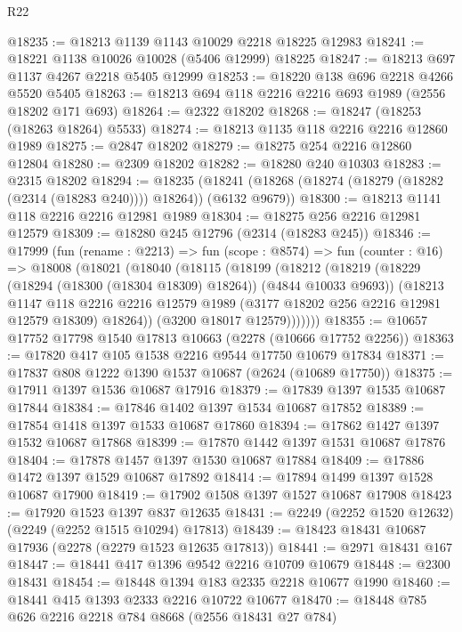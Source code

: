 \begin{lexlean}{R22}
\begin{coremodule}
@18235 := @18213 @1139 @1143 @10029 @2218 @18225 @12983
@18241 := @18221 @1138 @10026 @10028 (@5406 @12999) @18225
@18247 := @18213 @697 @1137 @4267 @2218 @5405 @12999
@18253 := @18220 @138 @696 @2218 @4266 @5520 @5405
@18263 := @18213 @694 @118 @2216 @2216 @693 @1989 (@2556 @18202 @171 @693)
@18264 := @2322 @18202
@18268 := @18247 (@18253 (@18263 @18264) @5533)
@18274 := @18213 @1135 @118 @2216 @2216 @12860 @1989
@18275 := @2847 @18202
@18279 := @18275 @254 @2216 @12860 @12804
@18280 := @2309 @18202
@18282 := @18280 @240 @10303
@18283 := @2315 @18202
@18294 := @18235
    (@18241 (@18268 (@18274 (@18279 (@18282 (@2314 (@18283 @240)))) @18264)) (@6132 @9679))
@18300 := @18213 @1141 @118 @2216 @2216 @12981 @1989
@18304 := @18275 @256 @2216 @12981 @12579
@18309 := @18280 @245 @12796 (@2314 (@18283 @245))
@18346 := @17999
    (fun (rename : @2213) =>
    fun (scope : @8574) =>
    fun (counter : @16) =>
    @18008
      (@18021
        (@18040
          (@18115
            (@18199
              (@18212
                (@18219
                  (@18229 (@18294 (@18300 (@18304 @18309) @18264)) (@4844 @10033 @9693))
                  (@18213
                    @1147
                    @118
                    @2216
                    @2216
                    @12579
                    @1989
                    (@3177 @18202 @256 @2216 @12981 @12579 @18309)
                    @18264))
                (@3200 @18017 @12579)))))))
@18355 := @10657 @17752 @17798 @1540 @17813 @10663 (@2278 (@10666 @17752 @2256))
@18363 := @17820 @417 @105 @1538 @2216 @9544 @17750 @10679 @17834
@18371 := @17837 @808 @1222 @1390 @1537 @10687 (@2624 (@10689 @17750))
@18375 := @17911 @1397 @1536 @10687 @17916
@18379 := @17839 @1397 @1535 @10687 @17844
@18384 := @17846 @1402 @1397 @1534 @10687 @17852
@18389 := @17854 @1418 @1397 @1533 @10687 @17860
@18394 := @17862 @1427 @1397 @1532 @10687 @17868
@18399 := @17870 @1442 @1397 @1531 @10687 @17876
@18404 := @17878 @1457 @1397 @1530 @10687 @17884
@18409 := @17886 @1472 @1397 @1529 @10687 @17892
@18414 := @17894 @1499 @1397 @1528 @10687 @17900
@18419 := @17902 @1508 @1397 @1527 @10687 @17908
@18423 := @17920 @1523 @1397 @837 @12635
@18431 := @2249 (@2252 @1520 @12632) (@2249 (@2252 @1515 @10294) @17813)
@18439 := @18423 @18431 @10687 @17936 (@2278 (@2279 @1523 @12635 @17813))
@18441 := @2971 @18431 @167
@18447 := @18441 @417 @1396 @9542 @2216 @10709 @10679
@18448 := @2300 @18431
@18454 := @18448 @1394 @183 @2335 @2218 @10677 @1990
@18460 := @18441 @415 @1393 @2333 @2216 @10722 @10677
@18470 := @18448 @785 @626 @2216 @2218 @784 @8668 (@2556 @18431 @27 @784)

\end{coremodule}
\end{lexlean}
